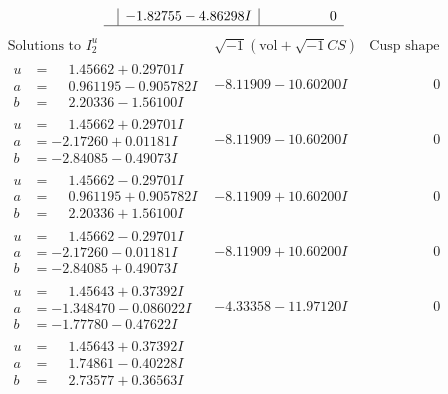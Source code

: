 \documentclass[1p]{elsarticle_modified}
\theoremstyle{definition}
\newcommand{\I}{\sqrt{-1}}
\begin{document}
$$\begin{array}{c|c|c}
 & -1.82755 - 4.86298 I & \phantom{-0.000000 } 0\\
 \hline 
 \end{array}$$\newpage$$\begin{array}{c|c|c}  
\text{Solutions to }I^u_{2}& \I (\text{vol} + \sqrt{-1}CS) & \text{Cusp shape}\\
 \hline 
\begin{aligned}
u &= \phantom{-}1.45662 + 0.29701 I \\
a &= \phantom{-}0.961195 - 0.905782 I \\
b &= \phantom{-}2.20336 - 1.56100 I\end{aligned}
 & -8.11909 - 10.60200 I & \phantom{-0.000000 } 0 \\ \hline\begin{aligned}
u &= \phantom{-}1.45662 + 0.29701 I \\
a &= -2.17260 + 0.01181 I \\
b &= -2.84085 - 0.49073 I\end{aligned}
 & -8.11909 - 10.60200 I & \phantom{-0.000000 } 0 \\ \hline\begin{aligned}
u &= \phantom{-}1.45662 - 0.29701 I \\
a &= \phantom{-}0.961195 + 0.905782 I \\
b &= \phantom{-}2.20336 + 1.56100 I\end{aligned}
 & -8.11909 + 10.60200 I & \phantom{-0.000000 } 0 \\ \hline\begin{aligned}
u &= \phantom{-}1.45662 - 0.29701 I \\
a &= -2.17260 - 0.01181 I \\
b &= -2.84085 + 0.49073 I\end{aligned}
 & -8.11909 + 10.60200 I & \phantom{-0.000000 } 0 \\ \hline\begin{aligned}
u &= \phantom{-}1.45643 + 0.37392 I \\
a &= -1.348470 - 0.086022 I \\
b &= -1.77780 - 0.47622 I\end{aligned}
 & -4.33358 - 11.97120 I & \phantom{-0.000000 } 0 \\ \hline\begin{aligned}
u &= \phantom{-}1.45643 + 0.37392 I \\
a &= \phantom{-}1.74861 - 0.40228 I \\
b &= \phantom{-}2.73577 + 0.36563 I\end{aligned}

\end{array}$$
\end{document}
